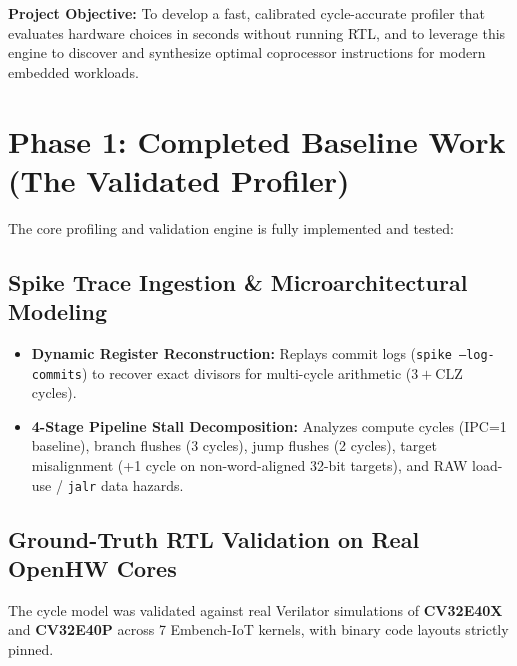 \documentclass[11pt,a4paper]{article}
\begin{document}
\noindent\textbf{Project Objective:} To develop a fast, calibrated cycle-accurate profiler that evaluates hardware choices in seconds without running RTL, and to leverage this engine to discover and synthesize optimal coprocessor instructions for modern embedded workloads.

\section{Phase 1: Completed Baseline Work (The Validated Profiler)}
The core profiling and validation engine is fully implemented and tested:

\subsection{Spike Trace Ingestion \& Microarchitectural Modeling}
\begin{itemize}[leftmargin=*]
    \item \textbf{Dynamic Register Reconstruction:} Replays commit logs (\texttt{spike --log-commits}) to recover exact divisors for multi-cycle arithmetic ($3 + \text{CLZ}$ cycles).
    \item \textbf{4-Stage Pipeline Stall Decomposition:} Analyzes compute cycles (IPC=1 baseline), branch flushes (3 cycles), jump flushes (2 cycles), target misalignment (+1 cycle on non-word-aligned 32-bit targets), and RAW load-use / \texttt{jalr} data hazards.
\end{itemize}

\subsection{Ground-Truth RTL Validation on Real OpenHW Cores}
The cycle model was validated against real Verilator simulations of \textbf{CV32E40X} and \textbf{CV32E40P} across 7 Embench-IoT kernels, with binary code layouts strictly pinned.
\end{document}

